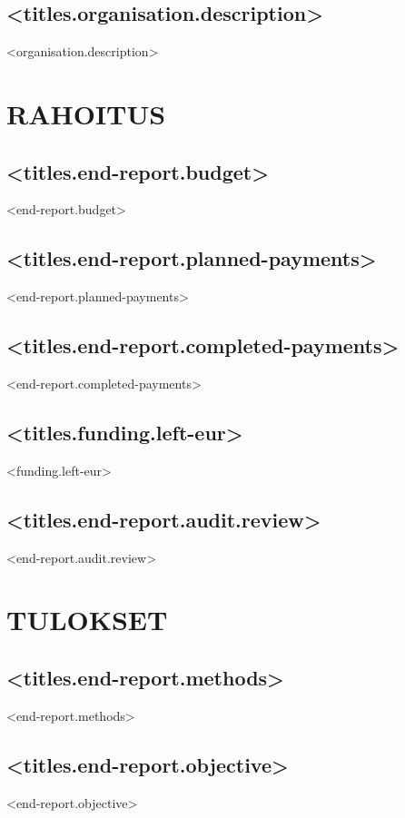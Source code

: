 \documentclass[twoside,a4paper]{article}
\begin{document}
		\subsection*{<titles.organisation.description>}
		    <organisation.description>
		
	\newpage		
	\section{RAHOITUS}
		\subsection*{<titles.end-report.budget>}
		    <end-report.budget>

		\subsection*{<titles.end-report.planned-payments>}
		    <end-report.planned-payments>
		
		\subsection*{<titles.end-report.completed-payments>}
		    <end-report.completed-payments>
		
		\subsection*{<titles.funding.left-eur>}
		    <funding.left-eur>
		    
		\subsection*{<titles.end-report.audit.review>}
		    <end-report.audit.review>

	\newpage		
	\section{TULOKSET}
		\subsection*{<titles.end-report.methods>}
		    <end-report.methods>
		
		\subsection*{<titles.end-report.objective>}
		    <end-report.objective>
		
\end{document}
